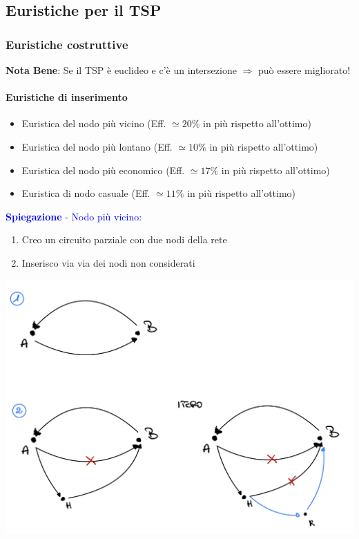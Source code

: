\documentclass[12pt,a4paper]{article}
\begin{document}
\subsection{Euristiche per il TSP}
\subsubsection{Euristiche costruttive}
\textbf{Nota Bene}: Se il TSP è euclideo e c'è un intersezione $\Rightarrow$ può essere migliorato!
\paragraph{Euristiche di inserimento}
\begin{itemize}
\item Euristica del nodo più vicino (Eff. $\simeq 20\%$ in più rispetto all'ottimo)
\item Euristica del nodo più lontano (Eff. $\simeq 10\%$ in più rispetto all'ottimo)
\item Euristica del nodo più economico (Eff. $\simeq 17\%$ in più rispetto all'ottimo)
\item Euristica di nodo casuale (Eff. $\simeq 11\%$ in più rispetto all'ottimo)
\end{itemize}
\textcolor{blue}{\textbf{Spiegazione} - Nodo più vicino:}
\begin{enumerate}
\item Creo un circuito parziale con due nodi della rete
\item Inserisco via via dei nodi non considerati
\end{enumerate}
\begin{center}
\includegraphics[width=0.4\columnwidth]{img/eur_nodo_vicino.jpeg}
\end{center}
\end{document}
